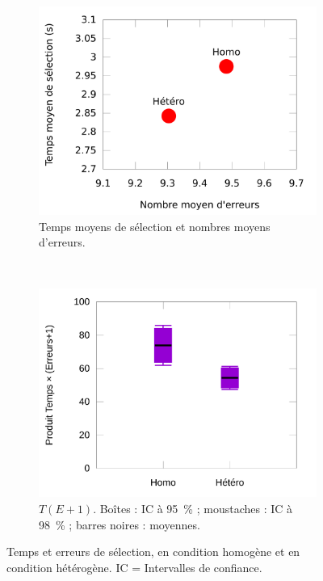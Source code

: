 \begin{figure}[!htb]
\begin{subfigure}[t]{0.49\textwidth}
			\centering
			\includegraphics[width=\textwidth]{figures/ch5/errorsTimesScatter}
			\caption{Temps moyens de sélection et nombres moyens d'erreurs.}
			\label{fig:errorsTimesScatter}
		\end{subfigure}
		~
		\begin{subfigure}[t]{0.49\textwidth}
			\centering
			\includegraphics[width=\textwidth]{figures/ch5/productRes}
			\caption{$T(E+1)$. Boîtes : IC à 95~\%{} ; \og moustaches \fg{} : IC à 98~\%{} ; barres noires : moyennes.}
			\label{fig:productRes}
		\end{subfigure}
		\caption[Temps et erreurs de sélection, homogène vs. hétérogène]{Temps et erreurs de sélection, en condition homogène et en condition hétérogène. IC = Intervalles de confiance.}
		\label{fig:timeAndErrorRes}
	\end{figure}
	
